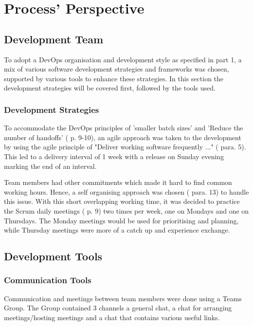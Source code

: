 \documentclass[report/main.tex]{subfiles}
\begin{document}
    \section{Process' Perspective}
    \label{Sec:process_perspective}
        \subsection{Development Team}
        \label{subsec:development-team}
            To adopt a DevOps organisation and development style as specified in \cite{devops-handbook} part 1, a mix of various software development strategies and frameworks was chosen, supported by various tools to enhance these strategies. In this section the development strategies will be covered first, followed by the tools used.
            
            \subsubsection{Development Strategies}
            \label{subsubsec:development-strategies}
                To accommodate the DevOps principles of 'smaller batch sizes' and 'Reduce the number of handoffs' (\cite{devops-handbook} p. 9-10), an agile approach was taken to the development by using the agile principle of "Deliver working software frequently ..." (\cite{agile-manifesto-second-page} para. 5). This led to a delivery interval of 1 week with a release on Sunday evening marking the end of an interval.
                
                Team members had other commitments which made it hard to find common working hours. Hence, a self organising approach was chosen (\cite{agile-manifesto-second-page} para. 13) to handle this issue. With this short overlapping working time, it was decided to practice the Scrum daily meetings (\cite{2020-scrum-guide} p. 9) two times per week, one on Mondays and one on Thursdays. The Monday meetings would be used for prioritising and planning, while Thursday meetings were more of a catch up and experience exchange.
        
        \subsection{Development Tools}
        \label{subsec:development-tools}
            \subsubsection{Communication Tools}
            \label{subsubsec:communication-tools}
                Communication and meetings between team members were done using a Teams Group. The Group contained 3 channels a general chat, a chat for arranging meetings/hosting meetings and a chat that contains various useful links.
                
\end{document}
